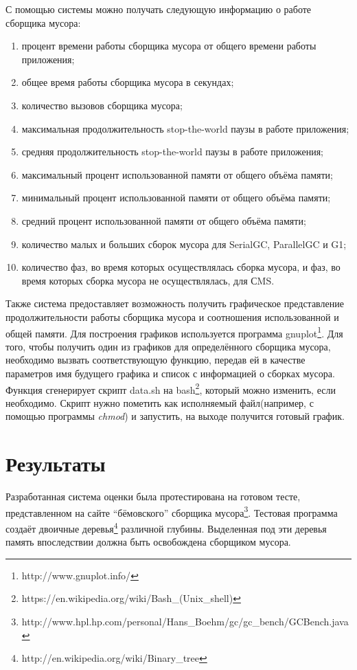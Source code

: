 С помощью системы можно получать следующую информацию о работе сборщика мусора:
\begin{enumerate}
\item процент времени работы сборщика мусора от общего времени работы приложения;
\item общее время работы сборщика мусора в секундах;
\item количество вызовов сборщика мусора;
\item максимальная продолжительность stop-the-world паузы в работе приложения;
\item средняя продолжительность stop-the-world паузы в работе приложения;
\item максимальный процент использованной памяти от общего объёма памяти;
\item минимальный процент использованной памяти от общего объёма памяти;
\item средний процент использованной памяти от общего объёма памяти;
\item количество малых и больших сборок мусора для SerialGC, ParallelGC и G1;
\item количество фаз, во время которых осуществлялась сборка мусора, и фаз, во время
которых сборка мусора не осуществлялась, для СMS.
\end{enumerate}


Также система предоставляет возможность получить графическое представление
продолжительности работы сборщика мусора и соотношения использованной и общей 
памяти. Для построения графиков
используется программа gnuplot\footnote{http://www.gnuplot.info/}.
Для того, чтобы получить один из графиков для определённого сборщика 
мусора, необходимо вызвать соответствующую функцию, передав ей в качестве параметров
имя будущего графика и список с информацией о сборках мусора. Функция
сгенерирует скрипт data.sh на bash\footnote{https://en.wikipedia.org/wiki/Bash\_(Unix\_shell)}, который можно изменить, если необходимо.
Скрипт нужно пометить как исполняемый файл(например,
с помощью программы \textit{chmod}) и запустить, на выходе получится готовый график.

\section{Результаты}
Разработанная система оценки была протестирована на готовом тесте, представленном 
на сайте ``бёмовского'' сборщика мусора\footnote{http://www.hpl.hp.com/personal/Hans\_Boehm/gc/gc\_bench/GCBench.java}.
Тестовая программа создаёт двоичные деревья\footnote{http://en.wikipedia.org/wiki/Binary\_tree}
различной глубины. Выделенная под эти деревья память впоследствии должна быть освобождена сборщиком мусора.


